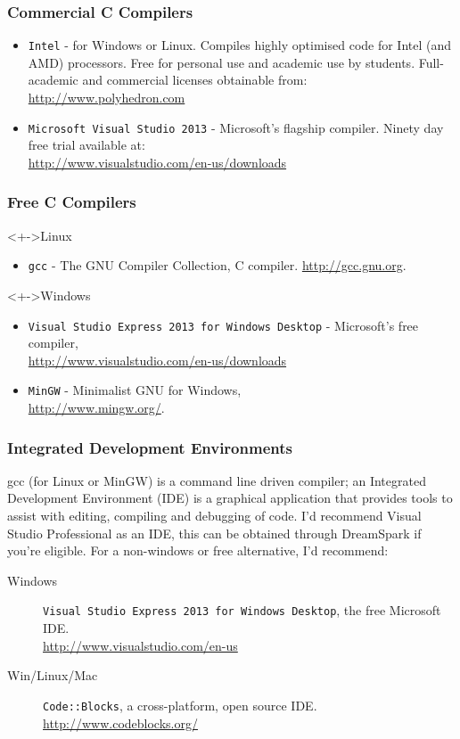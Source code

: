 \documentclass[smaller,handout,table]{beamer}
\begin{document}
\begin{frame}
\frametitle{Commercial C Compilers}
\begin{itemize}
\item {\tt Intel} - for Windows or Linux. Compiles highly optimised code for Intel (and AMD) processors. Free for personal use and academic use by students. Full-academic and commercial licenses obtainable from:\\
\url{http://www.polyhedron.com}
\item{\tt Microsoft Visual Studio 2013} - Microsoft's flagship compiler. Ninety day free trial available at:\\
\url{http://www.visualstudio.com/en-us/downloads}
\end{itemize}
\end{frame}

\begin{frame}
\frametitle{Free C Compilers}
\begin{block}<+->{Linux}
\begin{itemize}
\item {\tt gcc} - The GNU Compiler Collection, C compiler.
\url{http://gcc.gnu.org}.
\end{itemize}
\begin{block}<+->{Windows}
\begin{itemize}
\item {\tt Visual Studio Express 2013 for Windows Desktop} - Microsoft's free compiler,\\
\url{http://www.visualstudio.com/en-us/downloads}
\item {\tt MinGW} - Minimalist GNU for Windows,\\
\url{http://www.mingw.org/}.
\end{itemize}
\end{block}
\end{block}
\end{frame}

\begin{frame}
\frametitle{Integrated Development Environments}
gcc (for Linux or MinGW) is a command line driven compiler; an Integrated Development Environment (IDE) is a graphical application that provides tools to assist with editing, compiling and debugging of code. I'd recommend Visual Studio Professional as an IDE, this can be obtained through DreamSpark if you're eligible. For a non-windows or free alternative, I'd recommend:
\begin{block}{}
\begin{description}
\item[Windows] \texttt{Visual Studio Express 2013 for Windows Desktop}, the free Microsoft IDE.\\
\url{http://www.visualstudio.com/en-us}
\item[Win/Linux/Mac] \texttt{Code::Blocks}, a cross-platform, open source IDE.\\
\url{http://www.codeblocks.org/}
\end{description}
\end{block}
\end{frame}
\end{document}
